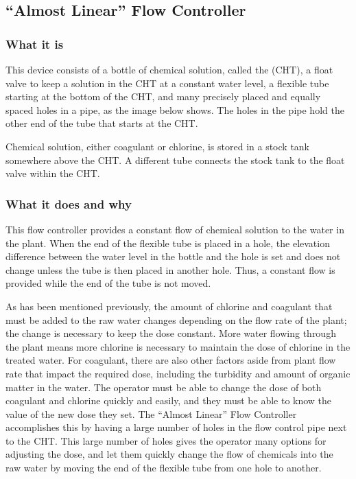 \documentclass[letterpaper,10pt,english]{sphinxmanual}
\begin{document}
\subsection{“Almost Linear” Flow Controller}
\label{\detokenize{Flow_Control_and_Measurement/FCM_Design:almost-linear-flow-controller}}\label{\detokenize{Flow_Control_and_Measurement/FCM_Design:id4}}

\subsubsection{What it is}
\label{\detokenize{Flow_Control_and_Measurement/FCM_Design:what-it-is}}
This device consists of a bottle of chemical solution, called the  (CHT), a float valve to keep a solution in the CHT at a constant water level, a flexible tube starting at the bottom of the CHT, and many precisely placed and equally spaced holes in a pipe, as the image below shows. The holes in the pipe hold the other end of the tube that starts at the CHT.

Chemical solution, either coagulant or chlorine, is stored in a stock tank somewhere above the CHT. A different tube connects the stock tank to the float valve within the CHT.


\subsubsection{What it does and why}
\label{\detokenize{Flow_Control_and_Measurement/FCM_Design:what-it-does-and-why}}
This flow controller provides a constant flow of chemical solution to the water in the plant. When the end of the flexible tube is placed in a hole, the elevation difference between the water level in the bottle and the hole is set and does not change unless the tube is then placed in another hole. Thus, a constant flow is provided while the end of the tube is not moved.

As has been mentioned previously, the amount of chlorine and coagulant that must be added to the raw water changes depending on the flow rate of the plant; the change is necessary to keep the dose constant. More water flowing through the plant means more chlorine is necessary to maintain the dose of chlorine in the treated water. For coagulant, there are also other factors aside from plant flow rate that impact the required dose, including the turbidity and amount of organic matter in the water. The operator must be able to change the dose of both coagulant and chlorine quickly and easily, and they must be able to know the value of the new dose they set. The “Almost Linear” Flow Controller accomplishes this by having a large number of holes in the flow control pipe next to the CHT. This large number of holes gives the operator many options for adjusting the dose, and let them quickly change the flow of chemicals into the raw water by moving the end of the flexible tube from one hole to another.
\end{document}
